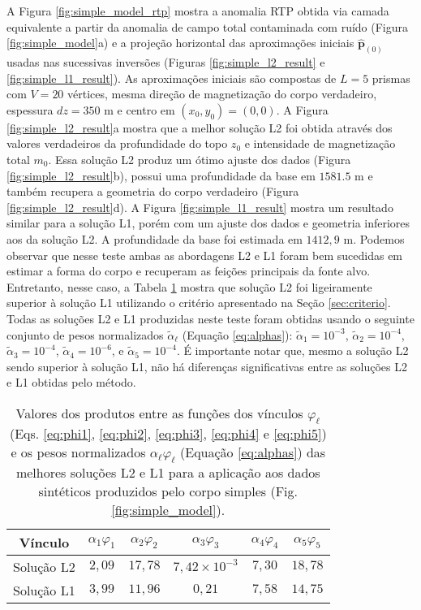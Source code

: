 A Figura \ref{fig:simple_model_rtp} mostra a anomalia RTP obtida via camada equivalente a partir da anomalia de campo total contaminada com ruído (Figura \ref{fig:simple_model}a) e 
a projeção horizontal das aproximações iniciais $\hat{\mathbf{p}}_{(0)}$ 
usadas nas sucessivas inversões (Figuras \ref{fig:simple_l2_result} e 
\ref{fig:simple_l1_result}).
As aproximações iniciais são compostas de $ L= 5$ prismas com $ V = 20 $ vértices, mesma direção de magnetização do corpo verdadeiro, espessura $ dz=350 $ m e centro em $ (x_0, y_0) = (0, 0) $.
A Figura \ref{fig:simple_l2_result}a mostra que a melhor solução L2 foi obtida através dos valores verdadeiros da profundidade do topo $z_{0}$ e intensidade de magnetização total $m_{0}$.
Essa solução L2 produz um ótimo ajuste dos dados (Figura \ref{fig:simple_l2_result}b), possui uma profundidade da base em $1581.5$ m e também recupera a geometria do corpo verdadeiro (Figura \ref{fig:simple_l2_result}d).
A Figura \ref{fig:simple_l1_result} mostra um resultado similar para a solução L1, porém com um ajuste dos dados e geometria inferiores aos da solução L2. A profundidade da base foi estimada em $1412,9$ m.
Podemos observar que nesse teste ambas as abordagens L2 e L1 foram bem sucedidas em estimar a forma do corpo e recuperam as feições principais da fonte alvo.
Entretanto, nesse caso, a Tabela \ref{tab:simple} mostra que solução L2 foi ligeiramente superior à solução L1 utilizando o critério apresentado na Seção \ref{sec:criterio}.
Todas as soluções L2 e L1 produzidas neste teste foram obtidas usando o seguinte conjunto de pesos normalizados $\tilde{\alpha}_{\ell}$ (Equação \ref{eq:alphas}): 
$\tilde{\alpha}_{1} = 10^{-3}$, $\tilde{\alpha}_{2} = 10^{-4}$, 
$\tilde{\alpha}_{3} = 10^{-4}$, $\tilde{\alpha}_{4} = 10^{-6}$, e 
$\tilde{\alpha}_{5} = 10^{-4}$. 
É importante notar que, mesmo a solução L2 sendo superior à solução L1, não há diferenças significativas entre as soluções L2 e L1 obtidas pelo método.

\begin{table}[h]\label{tab:simple}
	\caption{Valores dos produtos entre as funções dos vínculos $ \varphi_{\ell} $ (Eqs. \ref{eq:phi1}, \ref{eq:phi2}, \ref{eq:phi3}, \ref{eq:phi4} e \ref{eq:phi5}) e os pesos normalizados $ \alpha_\ell \varphi_\ell  $ (Equação \ref{eq:alphas}) das melhores soluções L2 e L1 para a aplicação aos dados sintéticos produzidos pelo corpo simples (Fig. \ref{fig:simple_model}).}
	\centering
	\vspace{0.5cm}
	\begin{tabular}{c|ccccc}
		Vínculo & $ \alpha_{1}\varphi _1 $ & $ \alpha_{2}\varphi _2 $ &  $ \alpha_{3}\varphi _3 $ &  $ \alpha_{4}\varphi _4 $ &  $ \alpha_{5}\varphi _5 $ \\
		\hline
		Solução L2 & $ 2,09 $ & $ 17,78 $ & $ 7,42\times 10^{-3} $ & $7,30 $ & $ 18,78 $ \\ 
		Solução L1 & $ 3,99 $ & $ 11,96 $ & $ 0,21 $ & $7,58$ & $ 14,75 $
	\end{tabular}
\end{table}

